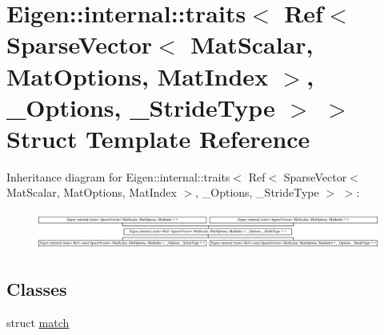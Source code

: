 \hypertarget{struct_eigen_1_1internal_1_1traits_3_01_ref_3_01_sparse_vector_3_01_mat_scalar_00_01_mat_optionsd46b48c0b126a924a96003bc7b99d5a2}{}\section{Eigen\+:\+:internal\+:\+:traits$<$ Ref$<$ Sparse\+Vector$<$ Mat\+Scalar, Mat\+Options, Mat\+Index $>$, \+\_\+\+Options, \+\_\+\+Stride\+Type $>$ $>$ Struct Template Reference}
\label{struct_eigen_1_1internal_1_1traits_3_01_ref_3_01_sparse_vector_3_01_mat_scalar_00_01_mat_optionsd46b48c0b126a924a96003bc7b99d5a2}
Inheritance diagram for Eigen\+:\+:internal\+:\+:traits$<$ Ref$<$ Sparse\+Vector$<$ Mat\+Scalar, Mat\+Options, Mat\+Index $>$, \+\_\+\+Options, \+\_\+\+Stride\+Type $>$ $>$\+:\begin{figure}[H]
\begin{center}
\leavevmode
\includegraphics[height=1.265060cm]{struct_eigen_1_1internal_1_1traits_3_01_ref_3_01_sparse_vector_3_01_mat_scalar_00_01_mat_optionsd46b48c0b126a924a96003bc7b99d5a2}
\end{center}
\end{figure}
\subsection*{Classes}
\begin{DoxyCompactItemize}
\item 
struct \hyperlink{struct_eigen_1_1internal_1_1traits_3_01_ref_3_01_sparse_vector_3_01_mat_scalar_00_01_mat_options4b581d834744f71c5c7313d6641690e6}{match}
\end{DoxyCompactItemize}
